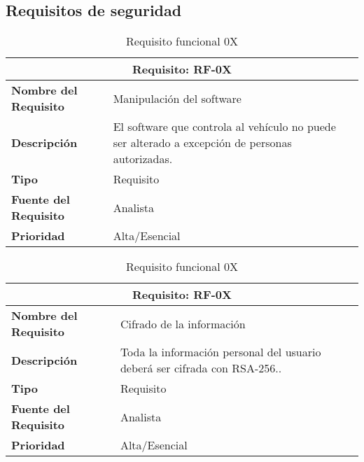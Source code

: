 \documentclass[10pt,a4paper,oldfontcommands]{dpds}
\begin{document}
\subsection{Requisitos de seguridad}

\begin{table}[H]
\begin{center}
\begin{tabular}{p{} p{7cm}}
\multicolumn{2}{c}{\textbf{Requisito: RF-0X} } \\
\hline \hline
\textbf{Nombre del Requisito} & Manipulación del software\\
\textbf{Descripción} & El software que controla al vehículo no puede ser alterado a excepción de personas autorizadas.\\
\textbf{Tipo} & Requisito  \\
\textbf{Fuente del Requisito} & Analista  \\
\textbf{Prioridad} & Alta/Esencial \\ \hline
\end{tabular}
\caption{Requisito funcional 0X}
\label{tab:personal}
\end{center}
\end{table}

\begin{table}[H]
\begin{center}
\begin{tabular}{p{} p{7cm}}
\multicolumn{2}{c}{\textbf{Requisito: RF-0X} } \\
\hline \hline
\textbf{Nombre del Requisito} & Cifrado de la información\\
\textbf{Descripción} & Toda la información personal del usuario deberá ser cifrada con RSA-256..\\
\textbf{Tipo} & Requisito  \\
\textbf{Fuente del Requisito} & Analista  \\
\textbf{Prioridad} & Alta/Esencial \\ \hline
\end{tabular}
\caption{Requisito funcional 0X}
\label{tab:personal}
\end{center}
\end{table}
\end{document}
